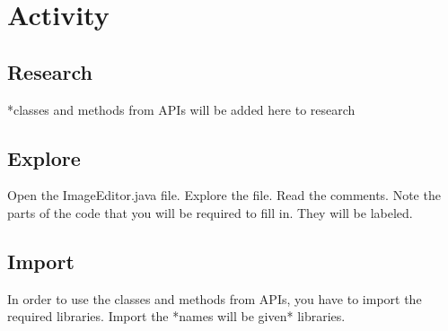 \section{Activity}

\subsection{Research}
*classes and methods from APIs will be added here to research

\subsection{Explore}
Open the ImageEditor.java file. Explore the file. Read the comments. Note the parts of the code that you will be required to fill in. They will be labeled.

\subsection{Import}
In order to use the classes and methods from APIs, you have to import the required libraries. Import the *names will be given* libraries.